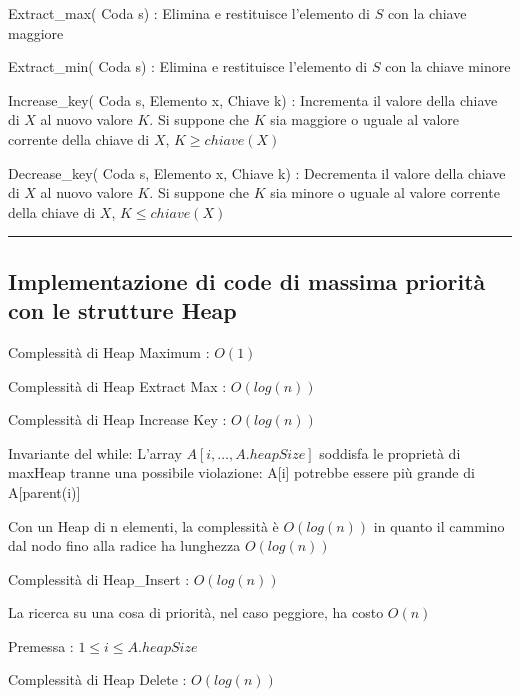 \documentclass[tikz]{article}
\begin{document}
{{Extract\_max( Coda s) : Elimina e restituisce l'elemento di $S$ con la chiave maggiore}

{Extract\_min( Coda s) : Elimina e restituisce l'elemento di $S$ con la chiave minore}

{Increase\_key( Coda s, Elemento x, Chiave k) : Incrementa il valore della chiave di $X$ al nuovo valore $K$. Si suppone che $K$ sia maggiore o uguale al valore corrente della chiave di $X$, $K \geq chiave(X)$}

{Decrease\_key( Coda s, Elemento x, Chiave k) : Decrementa il valore della chiave di $X$ al nuovo valore $K$. Si suppone che $K$ sia minore o uguale al valore corrente della chiave di $X$, $K \leq chiave(X)$}

\begin{center}\rule{0.5\linewidth}{\linethickness}\end{center}

\subsection{Implementazione di code di massima priorità con le strutture Heap}}



{Complessità di Heap Maximum : $O(1)$}



{Complessità di Heap Extract Max : $O(log(n))$}



{Complessità di Heap Increase Key : $O(log(n))$}

{Invariante del while: L'array $A[i,\ldots,A.heapSize]$ soddisfa le proprietà di maxHeap tranne una possibile violazione: A{[}i{]} potrebbe essere più grande di A{[}parent(i){]}}

{Con un Heap di n elementi, la complessità è $O(log(n))$ in quanto il cammino dal nodo fino alla radice ha lunghezza }$O(log(n))$



{Complessità di Heap\_Insert : }$O(log(n))$

{La ricerca su una cosa di priorità, nel caso peggiore, ha costo }$O(n)$

{Premessa : $1 \leq i \leq A.heapSize$}



{Complessità di Heap Delete : }$O(log(n))$
\end{document}
